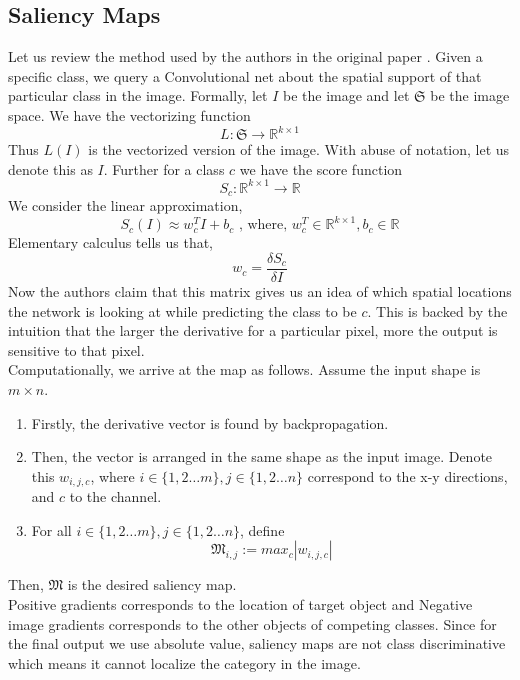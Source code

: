 \subsection{Saliency Maps}

Let us review the method used by the authors in the original paper \cite{saliency}. Given a specific class, we query a Convolutional net about the spatial support of that particular class in the image. Formally, let $I$ be the image and let $\mathfrak{S}$ be the image space. We have the vectorizing function
\[L: \mathfrak{S} \to \mathbb{R}^{k\times1}\]
Thus $L(I)$ is the vectorized version of the image. With abuse of notation, let us denote this as $I$. Further for a class $c$ we have the score function
\[S_c: \mathbb{R}^{k\times1} \to \mathbb{R}\]
We consider the linear approximation,
\[S_c(I) \approx w_c^TI + b_c \text{ , where, } w_c^T \in \mathbb{R}^{k\times1}, b_c \in \mathbb{R}\]
Elementary calculus tells us that,
\[w_c = \frac{\delta S_c}{\delta I}\]
Now the authors claim that this matrix gives us an idea of which spatial locations the network is looking at while predicting the class to be $c$. This is backed by the intuition that the larger the derivative for a particular pixel, more the output is sensitive to that pixel. \\ 
Computationally, we arrive at the map as follows. Assume the input shape is $m \times n$. \begin{enumerate}
\item Firstly, the derivative vector is found by backpropagation.
\item Then, the vector is arranged in the same shape as the input image. Denote this $w_{i,j,c}$, where $i \in \{1,2 \dots m\}, j \in \{1,2 \dots n\}$ correspond to the x-y directions, and $c$ to the channel.
\item For all $i \in \{1,2 \dots m\}, j \in \{1,2 \dots n\}$, define $$\mathfrak{M}_{i,j} := max_c|w_{i,j,c}|$$
\end{enumerate}
Then, $\mathfrak{M}$ is the desired saliency map. \\
Positive gradients corresponds to the location of target object and Negative image gradients corresponds to the other objects of competing classes. 
Since for the final output we use absolute value, saliency maps are not class discriminative which means it cannot localize the category in the image.   
